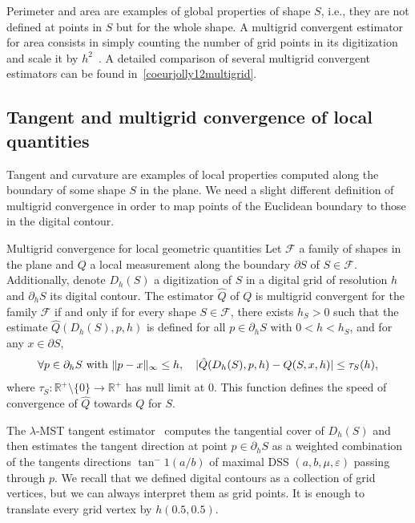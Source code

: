 Perimeter and area are examples of global properties of shape $S$, i.e., they are not defined at points in $S$ but for the whole shape. A multigrid convergent estimator for area consists in simply counting the number of grid points in its digitization and scale it by $h^2$~\cite{klette00multigrid}. A detailed comparison of several multigrid convergent estimators can be found in~\cref{coeurjolly12multigrid}.


\subsection{Tangent and multigrid convergence of local quantities}

Tangent and curvature are examples of local properties computed along the boundary of some shape $S$ in the plane. We need a slight different definition of multigrid convergence in order to map points of the Euclidean boundary to those in the digital contour.

\begin{definition}{Multigrid convergence for local geometric quantities}
Let $\mathcal{F}$ a family of shapes in the plane and $Q$ a local measurement along the boundary $\partial S$ of $S \in \mathcal{F}$. Additionally, denote $D_h(S)$ a digitization of $S$ in a digital grid of resolution $h$ and $\partial_h S$ its digital contour. The estimator $\hat{Q}$ of $Q$ is multigrid convergent for the family $\mathcal{F}$ if and only if for every shape $S \in \mathcal{F}$, there exists $h_S > 0$ such that the estimate $\hat{Q}(D_h(S),p,h)$ is defined for all $p \in \partial_h S$ with $0 < h < h_S$, and for any $x \in \partial S$,
\begin{align*}
	\forall p \in \partial_h S \text{ with } \lVert p-x\rVert_{\infty} \leq h,\quad | \hat{Q}(D_h(S),p,h) - Q(S,x,h) | \leq \tau_S(h),	
\end{align*}
where $\tau_S:\mathbb{R}^+\setminus \{0\} \rightarrow \mathbb{R}^+$ has null limit at $0$. This function defines the speed of convergence of $\hat{Q}$ towards $Q$ for $S$.
\end{definition}


The $\lambda$-MST tangent estimator~\cite{lachaud07tangent} computes the tangential cover of $D_h(S)$ and then estimates the tangent direction at point $p \in \partial_h S$ as a weighted combination of the tangents directions $\tan^-1(a/b)$  of maximal DSS $(a,b,\mu,\varepsilon)$ passing through $p$. We recall that we defined digital contours as a collection of grid vertices, but we can always interpret them as grid points. It is enough to translate every grid vertex by $h(0.5,0.5)$.

